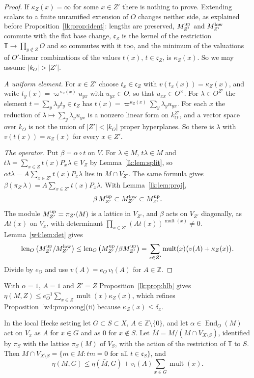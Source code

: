 \begin{proof}
If $\kappa_Z(x)=\infty$ for some $x\in Z'$ there is nothing to prove. Extending scalars to a finite unramified extension of $O$ changes neither side, as explained before Proposition~\ref{lk:prop:ident}: lengths are preserved, $M^{\rm up}_{Z'}$ and $M^{\rm low}_{Z'}$ commute with the flat base change, $\mathfrak c_Z$ is the kernel of the restriction $\mathbb T\to\prod_{y\notin Z}O$ and so commutes with it too, and the minimum of the valuations of $O'$-linear combinations of the values $t(x)$, $t\in\mathfrak c_Z$, is $\kappa_Z(x)$. So we may assume $\lvert k_O\rvert>\lvert Z'\rvert$.

\emph{A uniform element.} For $x\in Z'$ choose $t_x\in\mathfrak c_Z$ with $v(t_x(x))=\kappa_Z(x)$, and write $t_y(x)=\varpi^{\kappa_Z(x)}u_{yx}$ with $u_{yx}\in O$, so that $u_{xx}\in O^\times$. For $\lambda\in O^{Z'}$ the element $t=\sum_y\lambda_yt_y\in\mathfrak c_Z$ has $t(x)=\varpi^{\kappa_Z(x)}\sum_y\lambda_yu_{yx}$. For each $x$ the reduction of $\lambda\mapsto\sum_y\lambda_yu_{yx}$ is a nonzero linear form on $k_O^{Z'}$, and a vector space over $k_O$ is not the union of $\lvert Z'\rvert<\lvert k_O\rvert$ proper hyperplanes. So there is $\lambda$ with $v(t(x))=\kappa_Z(x)$ for every $x\in Z'$.

\emph{The operator.} Put $\beta=\alpha\circ t$ on $V$. For $\lambda\in M$, $t\lambda\in M$ and $t\lambda=\sum_{x\in Z}t(x)P_x\lambda\in V_Z$ by Lemma~\ref{lk:lem:split}, so $\alpha t\lambda=A\sum_{x\in Z'}t(x)P_x\lambda$ lies in $M\cap V_{Z'}$. The same formula gives $\beta(\pi_{Z'}\lambda)=A\sum_{x\in Z'}t(x)P_x\lambda$. With Lemma~\ref{lk:lem:proj},
\[
\beta\,M^{\rm up}_{Z'}\subset M^{\rm low}_{Z'}\subset M^{\rm up}_{Z'} .
\]
The module $M^{\rm up}_{Z'}=\pi_{Z'}(M)$ is a lattice in $V_{Z'}$, and $\beta$ acts on $V_{Z'}$ diagonally, as $At(x)$ on $V_x$, with determinant $\prod_{x\in Z'}(At(x))^{\operatorname{mult}(x)}\ne0$. Lemma~\ref{w4:lem:det} gives
\[
\operatorname{len}_O\big(M^{\rm up}_{Z'}/M^{\rm low}_{Z'}\big)\le\operatorname{len}_O\big(M^{\rm up}_{Z'}/\beta M^{\rm up}_{Z'}\big)=\sum_{x\in Z'}\operatorname{mult}(x)\big(v(A)+\kappa_Z(x)\big).
\]
Divide by $e_O$ and use $v(A)=e_O\,v_l(A)$ for $A\in\mathbb Z$.
\end{proof}

With $\alpha=1$, $A=1$ and $Z'=Z$ Proposition~\ref{lk:prop:hlb} gives $\eta(M,Z)\le e_O^{-1}\sum_{x\in Z}\operatorname{mult}(x)\kappa_Z(x)$, which refines Proposition~\ref{w4:prop:cong}(ii) because $\kappa_Z(x)\le\delta_x$.

\begin{proposition}\label{lk:prop:cut}
In the local Hecke setting let $G\subset S\subset X$, $A\in\mathbb Z\setminus\{0\}$, and let $\alpha\in\operatorname{End}_O(M)$ act on $V_x$ as $A$ for $x\in G$ and as $0$ for $x\notin S$. Let $\bar M=M/(M\cap V_{X\setminus S})$, identified by $\pi_S$ with the lattice $\pi_S(M)$ of $V_S$, with the action of the restriction of $\mathbb T$ to $S$. Then $M\cap V_{X\setminus S}=\{m\in M:tm=0\text{ for all }t\in\mathfrak c_S\}$, and
\[
\eta(M,G)\le\eta(\bar M,G)+v_l(A)\sum_{x\in G}\operatorname{mult}(x).
\]
\end{proposition}

